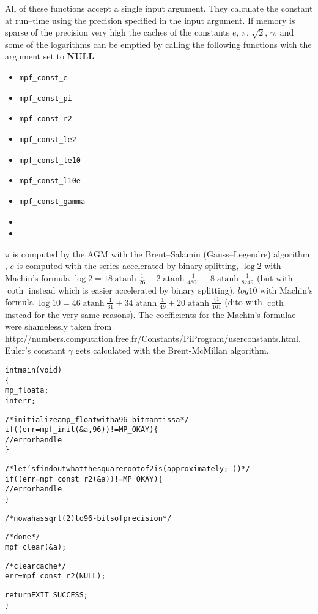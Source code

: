 \documentclass[a4paper]{book}
\theoremstyle{definition}
\theoremstyle{remark}
\DeclareMathOperator{\atanh}{atanh}
\begin{document}
All of these functions accept a single input argument. They calculate the constant at run--time using the precision specified in the input argument.
If memory is sparse of the precision very high the caches of the constants $e$, $\pi$, $\sqrt{2}$, $\gamma$, and some of the logarithms can be emptied by calling the following functions with the argument set to {\textbf{NULL}}
\begin{itemize}
\item{{\texttt{mpf\_const\_e}}}
\item{{\texttt{mpf\_const\_pi}}}
\item{{\texttt{mpf\_const\_r2}}}
\item{{\texttt{mpf\_const\_le2}}}
\item{{\texttt{mpf\_const\_le10}}}
\item{{\texttt{mpf\_const\_l10e}}}
\item{{\texttt{mpf\_const\_gamma}}}
\item{}
\item{}
\end{itemize}

$\pi$ is computed by the AGM with the Brent--Salamin (Gauss--Legendre) algorithm
\cite{borwein1987way,bailey1997quest,brent2006fast}, $e$ is computed with the series accelerated by binary splitting, $\log 2$ with Machin's formula $\log 2  = 18 \atanh\frac{1}{26} - 2\atanh\frac{1}{4801} + 8\atanh\frac{1}{8749}$ (but with $\coth$ instead which is easier accelerated by binary splitting), $log 10$ with Machin's formula $\log 10 =46\atanh\frac{1}{31}+34\atanh\frac{1}{49}+20\atanh\frac{(1}{161}$ (dito with $\coth$ instead for the very same reasons). The coefficients for the Machin's formulae were shamelessly taken from {\url{http://numbers.computation.free.fr/Constants/PiProgram/userconstants.html}}. Euler's constant $\gamma$ gets calculated with the Brent-McMillan algorithm\cite{borwein2004mathematics}.

\begin{alltt}
int main(void)
\{
   mp_float a;
   int err;

   /* initialize a mp_float with a 96-bit mantissa */
   if ((err = mpf_init(&a, 96)) != MP_OKAY) \{
      // error handle
   \}

   /* let's find out what the square root of 2 is (approximately ;-)) */
   if ((err = mpf_const_r2(&a)) != MP_OKAY) \{
      // error handle 
   \}

   /* now a has sqrt(2) to 96-bits of precision */

   /* done */
   mpf_clear(&a);

   /* clear cache */
   err = mpf_const_r2(NULL);

   return EXIT_SUCCESS;
\}
\end{alltt}
\end{document}
